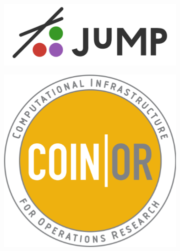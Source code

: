 \documentclass{beamer}
\begin{document}
\begin{frame}
\begin{figure}[htbp]
\begin{subfigure}{0.24\textwidth}
        \end{subfigure}
        \begin{subfigure}{0.24\textwidth}
            \includegraphics[width=\textwidth]{img/jump_logo.png}
        \end{subfigure}
        \begin{subfigure}{0.24\textwidth}
            \includegraphics[width=\textwidth]{img/ipopt_logo.png}
        \end{subfigure}
    \end{figure}
\end{frame}
\end{document}
